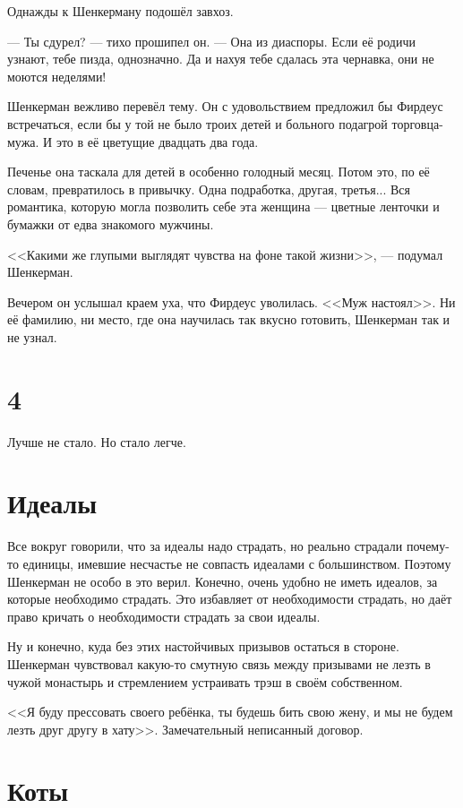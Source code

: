 \documentclass[a4paper,10pt,fleqn]{book}\usepackage{polyglossia}\setdefaultlanguage{english}\setotherlanguage{russian}\defaultfontfeatures{Ligatures=TeX,Mapping=tex-text} \usepackage{xcolor}\definecolor{lightgray}{HTML}{bbbbbb}\color{lightgray}\newcommand{\ml}[3]{\textcolor{black}{#3}}
\begin{document}
Однажды к Шенкерману подошёл завхоз.

--- Ты сдурел? --- тихо прошипел он.
--- Она из диаспоры.
Если её родичи узнают, тебе пизда, однозначно.
Да и нахуя тебе сдалась эта чернавка, они не моются неделями!

Шенкерман вежливо перевёл тему.
Он с удовольствием предложил бы Фирдеус встречаться, если бы у той не было троих детей и больного подагрой торговца-мужа.
И это в её цветущие двадцать два года.

Печенье она таскала для детей в особенно голодный месяц.
Потом это, по её словам, превратилось в привычку.
Одна подработка, другая, третья...
Вся романтика, которую могла позволить себе эта женщина --- цветные ленточки и бумажки от едва знакомого мужчины.

<<Какими же глупыми выглядят чувства на фоне такой жизни>>, --- подумал Шенкерман.

Вечером он услышал краем уха, что Фирдеус уволилась.
<<Муж настоял>>.
Ни её фамилию, ни место, где она научилась так вкусно готовить, Шенкерман так и не узнал.

\section{4}

Лучше не стало.
Но стало легче.

\section{Идеалы}

Все вокруг говорили, что за идеалы надо страдать, но реально страдали почему-то единицы, имевшие несчастье не совпасть идеалами с большинством.
Поэтому Шенкерман не особо в это верил.
Конечно, очень удобно не иметь идеалов, за которые необходимо страдать.
Это избавляет от необходимости страдать, но даёт право кричать о необходимости страдать за свои идеалы.

Ну и конечно, куда без этих настойчивых призывов остаться в стороне.
Шенкерман чувствовал какую-то смутную связь между призывами не лезть в чужой монастырь и стремлением устраивать трэш в своём собственном.

<<Я буду прессовать своего ребёнка, ты будешь бить свою жену, и мы не будем лезть друг другу в хату>>.
Замечательный неписанный договор.

\section{Коты}
\end{document}
